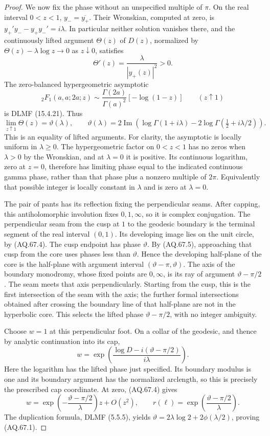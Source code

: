 \begin{proof}
We now fix the phase without an unspecified multiple of $\pi$.
On the real interval $0<z<1$, $y_- =\overline{y_+}$.
Their Wronskian, computed at zero, is
$y_+'y_- -y_+y_-'=i\lambda$. In particular neither solution
vanishes there, and the continuously lifted argument $\Theta(z)$
of $D(z)$, normalized by
$\Theta(z)-\lambda\log z\longrightarrow0$ as $z\downarrow0$,
satisfies
\[
 \Theta'(z)=\frac{\lambda}{|y_+(z)|^2}>0.
                                                               \tag{AQ.67.5}
\]
The zero-balanced hypergeometric asymptotic
\[
 {}_2F_1(a,a;2a;z)
   \sim\frac{\Gamma(2a)}{\Gamma(a)^2}[-\log(1-z)]
       \qquad (z\uparrow1)
\]
is DLMF (15.4.21). Thus
\[
 \lim_{z\uparrow1}\Theta(z)=\vartheta(\lambda),\qquad
 \vartheta(\lambda)=2\operatorname{Im}
       \left(\log\Gamma(1+i\lambda)
                    -2\log\Gamma(\tfrac12+i\lambda/2)\right).
                                                               \tag{AQ.67.6}
\]
This is an equality of lifted arguments. For clarity, the
asymptotic is locally uniform in $\lambda\geq0$. The hypergeometric
factor on $0<z<1$ has no zeros when $\lambda>0$ by the Wronskian,
and at $\lambda=0$ it is positive. Its continuous logarithm,
zero at $z=0$, therefore has limiting phase equal to the indicated
continuous gamma phase, rather than that phase plus a nonzero
multiple of $2\pi$. Equivalently that possible integer is locally
constant in $\lambda$ and is zero at $\lambda=0$.

The pair of pants has its reflection fixing the perpendicular
seams. After capping, this antiholomorphic involution fixes
$0,1,\infty$, so it is complex conjugation. The perpendicular
seam from the cusp at $1$ to the geodesic boundary is the terminal
segment of the real interval $(0,1)$. Its developing image lies
on the unit circle, by (AQ.67.4). The cusp endpoint has phase
$\vartheta$. By (AQ.67.5), approaching that cusp from the core
uses phases less than $\vartheta$. Hence the developing half-plane
of the core is the half-plane with argument interval
$(\vartheta-\pi,\vartheta)$. The axis of the boundary monodromy,
whose fixed points are $0,\infty$, is its ray of argument
$\vartheta-\pi/2$. The seam meets that axis perpendicularly.
Starting from the cusp, this is the first intersection of the
seam with the axis; the further formal intersections obtained
after crossing the boundary line of that half-plane are not in
the hyperbolic core. This selects the lifted phase
$\vartheta-\pi/2$, with no integer ambiguity.

Choose $w=1$ at this perpendicular foot. On a collar of the
geodesic, and thence by analytic continuation into its cap,
\[
 w=\exp\left(\frac{\log D-i(\vartheta-\pi/2)}{i\lambda}\right).
\]
Here the logarithm has the lifted phase just specified.
Its boundary modulus is one and its boundary argument has the
normalized arclength, so this is precisely the prescribed cap
coordinate. At zero, (AQ.67.4) gives
\[
 w=\exp\left(-\frac{\vartheta-\pi/2}{\lambda}\right)z+O(z^2),
 \qquad
 r(\ell)=\exp\left(\frac{\vartheta-\pi/2}{\lambda}\right).
                                                               \tag{AQ.67.7}
\]
The duplication formula, DLMF (5.5.5), yields
$\vartheta=2\lambda\log2+2\phi(\lambda/2)$, proving
(AQ.67.1).


\end{proof}
